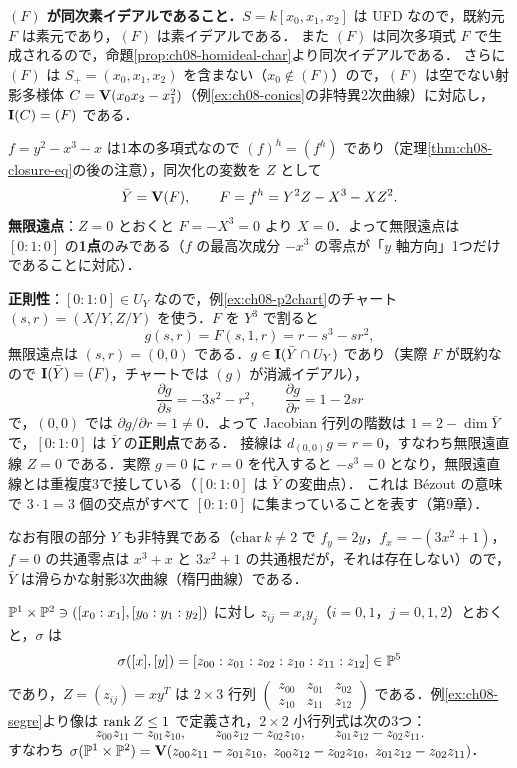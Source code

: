 \textbf{$(F)$ が同次素イデアルであること．}$S=k[x_0,x_1,x_2]$ は UFD なので，既約元 $F$ は素元であり，$(F)$ は素イデアルである．
また $(F)$ は同次多項式 $F$ で生成されるので，命題\ref{prop:ch08-homideal-char}より同次イデアルである．
さらに $(F)$ は $S_+=(x_0,x_1,x_2)$ を含まない（$x_0\notin(F)$）ので，$(F)$ は空でない射影多様体 $C=\mathbf{V}(x_0x_2-x_1^2)$（例\ref{ex:ch08-conics}の非特異2次曲線）に対応し，$\mathbf{I}(C)=(F)$ である．

$f=y^2-x^3-x$ は1本の多項式なので $(f)^h=(f^h)$ であり（定理\ref{thm:ch08-closure-eq}の後の注意），同次化の変数を $Z$ として
\[
  \bar Y=\mathbf{V}(F),\qquad F=f^h=Y^2Z-X^3-XZ^2.
\]
\textbf{無限遠点}：$Z=0$ とおくと $F=-X^3=0$ より $X=0$．よって無限遠点は $[0:1:0]$ の\textbf{1点}のみである（$f$ の最高次成分 $-x^3$ の零点が「$y$ 軸方向」1つだけであることに対応）．

\textbf{正則性}：$[0:1:0]\in U_Y$ なので，例\ref{ex:ch08-p2chart}のチャート $(s,r)=(X/Y,Z/Y)$ を使う．$F$ を $Y^3$ で割ると
\[
  g(s,r)=F(s,1,r)=r-s^3-sr^2,
\]
無限遠点は $(s,r)=(0,0)$ である．$g\in\mathbf{I}(\bar Y\cap U_Y)$ であり（実際 $F$ が既約なので $\mathbf{I}(\bar Y)=(F)$，チャートでは $(g)$ が消滅イデアル），
\[
  \frac{\partial g}{\partial s}=-3s^2-r^2,\qquad \frac{\partial g}{\partial r}=1-2sr
\]
で，$(0,0)$ では $\partial g/\partial r=1\neq0$．よって Jacobian 行列の階数は $1=2-\dim\bar Y$ で，$[0:1:0]$ は $\bar Y$ の\textbf{正則点}である．
接線は $d_{(0,0)}g=r=0$，すなわち無限遠直線 $Z=0$ である．実際 $g=0$ に $r=0$ を代入すると $-s^3=0$ となり，無限遠直線とは重複度3で接している（$[0:1:0]$ は $\bar Y$ の変曲点）．
これは B\'ezout の意味で $3\cdot1=3$ 個の交点がすべて $[0:1:0]$ に集まっていることを表す（第9章）．

なお有限の部分 $Y$ も非特異である（$\mathrm{char}\,k\neq2$ で $f_y=2y$，$f_x=-(3x^2+1)$，$f=0$ の共通零点は $x^3+x$ と $3x^2+1$ の共通根だが，それは存在しない）ので，$\bar Y$ は滑らかな射影3次曲線（楕円曲線）である．

$\mathbb{P}^1\times\mathbb{P}^2\ni([x_0:x_1],[y_0:y_1:y_2])$ に対し $z_{ij}=x_iy_j$（$i=0,1$，$j=0,1,2$）とおくと，$\sigma$ は
\[
  \sigma([x],[y])=[z_{00}:z_{01}:z_{02}:z_{10}:z_{11}:z_{12}]\in\mathbb{P}^5
\]
であり，$Z=(z_{ij})=xy^T$ は $2\times3$ 行列
$\begin{pmatrix}z_{00}&z_{01}&z_{02}\\z_{10}&z_{11}&z_{12}\end{pmatrix}$ である．例\ref{ex:ch08-segre}より像は $\operatorname{rank} Z\le1$ で定義され，$2\times2$ 小行列式は次の3つ：
\[
  z_{00}z_{11}-z_{01}z_{10},\qquad z_{00}z_{12}-z_{02}z_{10},\qquad z_{01}z_{12}-z_{02}z_{11}.
\]
すなわち $\sigma(\PP^1\times\PP^2)=\Zero(z_{00}z_{11}-z_{01}z_{10},\ z_{00}z_{12}-z_{02}z_{10},\ z_{01}z_{12}-z_{02}z_{11})$．

